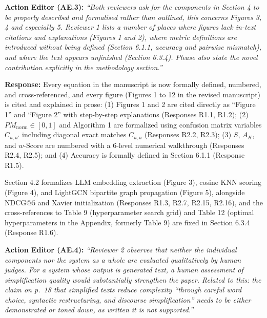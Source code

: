 \documentclass[11pt,a4paper]{article}
\newcommand{\mmhl}[1]{#1}
\begin{document}
\begin{reviewbox}
\textbf{Action Editor (AE.3):} \textit{``Both reviewers ask for the components in Section 4 to be properly described and formalised rather than outlined, this concerns Figures 3, 4 and especially 5. Reviewer 1 lists a number of places where figures lack in-text citations and explanations (Figures 1 and 2), where metric definitions are introduced without being defined (Section 6.1.1, accuracy and pairwise mismatch), and where the text appears unfinished (Section 6.3.4). Please also state the novel contribution explicitly in the methodology section.''}
\end{reviewbox}

\noindent\textbf{Response:}
Every equation in the manuscript is now formally defined, numbered, and cross-referenced, and every figure (Figures 1 to 12 in the revised manuscript) is cited and explained in prose: (1) Figures 1 and 2 are cited directly as ``Figure 1'' and ``Figure 2'' with step-by-step explanations (Responses R1.1, R1.2); (2) $PM_{\text{norm}} \in [0, 1]$ and Algorithm 1 are formalized using confusion matrix variables $C_{u,u'}$ including diagonal exact matches $C_{u,u}$ (Responses R2.2, R2.3); (3) $S$, $A_K$, and $w\text{-Score}$ are numbered with a 6-level numerical walkthrough (Responses R2.4, R2.5); and (4) Accuracy is formally defined in Section 6.1.1 (Response R1.5).

Section 4.2 formalizes LLM embedding extraction (Figure 3), cosine KNN scoring (Figure 4), and LightGCN bipartite graph propagation (Figure 5), alongside $\text{NDCG}@5$ and Xavier initialization (Responses R1.3, R2.7, R2.15, R2.16), and the cross-references to Table \mmhl{9} (hyperparameter search grid) and Table \mmhl{12} (optimal hyperparameters in the Appendix, formerly Table 9) are fixed in Section 6.3.4 (Response R1.6).

\begin{reviewbox}
\textbf{Action Editor (AE.4):} \textit{``Reviewer 2 observes that neither the individual components nor the system as a whole are evaluated qualitatively by human judges. For a system whose output is generated text, a human assessment of simplification quality would substantially strengthen the paper. Related to this: the claim on p.\ 18 that simplified texts reduce complexity ``through careful word choice, syntactic restructuring, and discourse simplification'' needs to be either demonstrated or toned down, as written it is not supported.''}
\end{reviewbox}
\end{document}
